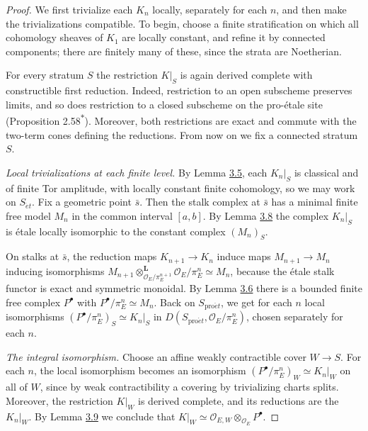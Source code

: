 \documentclass[11pt]{article}
\newcommand{\bpout}[1]{#1\textsuperscript{\hyperlink{bp-outside}{\ensuremath{\ast}}}}
\begin{document}
\begin{proof}[{Proof}]\label{bp32}%
We first trivialize each \(K_n\) locally, separately for each \(n\), and then make the trivializations compatible. To begin, choose a finite stratification on which all cohomology sheaves of \(K_1\) are locally constant, and refine it by connected components; there are finitely many of these, since the strata are Noetherian.

For every stratum \(S\) the restriction \(K|_S\) is again derived complete with constructible first reduction. Indeed, restriction to an open subscheme preserves limits, and so does restriction to a closed subscheme on the pro-étale site (Proposition \bpout{2.58}). Moreover, both restrictions are exact and commute with the two-term cones defining the reductions. From now on we fix a connected stratum \(S\).

\emph{Local trivializations at each finite level.} By Lemma \hyperref[bp16]{3.5}, each \(K_n|_S\) is classical and of finite Tor amplitude, with locally constant finite cohomology, so we may work on \(S_{\acute{e}t}\). Fix a geometric point \(\bar s\). Then the stalk complex at \(\bar s\) has a minimal finite free model \(M_n\) in the common interval \([a,b]\). By Lemma \hyperref[bp26]{3.8} the complex \(K_n|_S\) is étale locally isomorphic to the constant complex \((M_n)_S\).

On stalks at \(\bar s\), the reduction maps \(K_{n+1}\to K_n\) induce maps \(M_{n+1}\to M_n\) inducing isomorphisms \(M_{n+1}\otimes^{\mathbf L}_{\mathcal O_E/\pi_E^{n+1}}\mathcal O_E/\pi_E^n\simeq M_n\), because the étale stalk functor is exact and symmetric monoidal. By Lemma \hyperref[bp19]{3.6} there is a bounded finite free complex \(P^\bullet\) with \(P^\bullet/\pi_E^n\simeq M_n\). Back on \(S_{\mathrm{pro}\acute{e}t}\), we get for each \(n\) local isomorphisms \((P^\bullet/\pi_E^n)_S\simeq K_n|_S\) in \(D(S_{\mathrm{pro}\acute{e}t},\mathcal O_E/\pi_E^n)\), chosen separately for each \(n\).

\emph{The integral isomorphism.} Choose an affine weakly contractible cover \(W\to S\). For each \(n\), the local isomorphism becomes an isomorphism \((P^\bullet/\pi_E^n)_W\simeq K_n|_W\) on all of \(W\), since by weak contractibility a covering by trivializing charts splits. Moreover, the restriction \(K|_W\) is derived complete, and its reductions are the \(K_n|_W\). By Lemma \hyperref[bp29]{3.9} we conclude that \(K|_W\simeq\mathcal O_{E,W}\otimes_{\mathcal O_E}P^\bullet\).
\end{proof}
\end{document}
